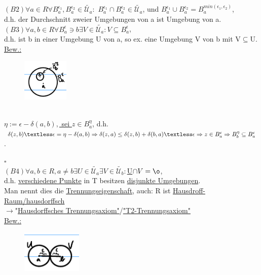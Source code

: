 \documentclass[]{scrartcl}
\begin{document}
	$(B2) \forall a \in R \forall B_a^{\epsilon_1}, B_a^{\epsilon_2} \in \tilde{\mathcal{U}_a}:$ \ul{$B_a^{\epsilon_1}\cap B_a^{\epsilon_2}\in \tilde{\mathcal{U}_a}$}, und \ul{$B_a^{\epsilon_1}\cup B_a^{\epsilon_2}=B_a^{min(\epsilon_1,\epsilon_2)}$},\\
	d.h. der Durchschnitt zweier Umgebungen von a ist Umgebung von a.\\
	$(B3)\forall a,b \in R \forall $\ul{$B_a^\epsilon \ni b \exists V \in \tilde{\mathcal{U}_a}: V \subseteq B_a^\epsilon$},\\
	d.h. ist b in einer Umgebung U von a, so ex. eine Umgebung V von b mit V$\subseteq$U.\\
	\underline{Bew.:}
	\begin{figure}[h]
		\includegraphics[width=2 cm,height=2cm]{bsp kap 11.3}
	\end{figure}\\
	\ul{$\eta:=\epsilon-\delta(a,b),$ sei $z\in B_a^\eta$}, d.h. $\delta(z,b)\textless \epsilon=\eta - \delta(a,b)\\ 
	\Rightarrow \delta(z,a)\leq \delta(z,b)+\delta(b,a)\textless \epsilon \Rightarrow z \in B_a^\epsilon\Rightarrow B_b^\eta \subseteq B_a^\epsilon$.\\
	\strut\hfill$\square$\\
	$(B4)\forall a,b \in R, a \neq b \exists U \in \tilde{\mathcal{U}_a}\exists V \in \tilde{\mathcal{U}_b}: $\ul{U$\cap V =\o$},\\
	d.h. \ul{verschiedene Punkte} in T besitzen \ul{disjunkte Umgebungen}.\\
	Man nennt dies die \ul{Trennungseigenschaft}, auch: R ist \ul{Hausdroff-Raum/hausdorffsch}\\
	$\rightarrow$"\ul{Hausdorffsches Trennungsaxiom"}/\ul{"T2-Trennungsaxiom"}\\
	\underline{Bew.:} 
	\begin{figure}[h]
		\includegraphics[width=2.5 cm,height=2cm]{bsp kap 11.3 2}
	\end{figure}\\
\end{document}
